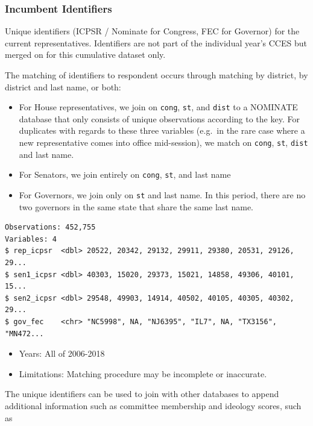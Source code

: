 \documentclass[10pt,article,oneside]{memoir}
\theoremstyle{definition}
\begin{document}
\subsubsection{Incumbent Identifiers}\label{incumbent-identifiers}

Unique identifiers (ICPSR / Nominate for Congress, FEC for Governor) for
the current representatives. Identifiers are not part of the individual
year's CCES but merged on for this cumulative dataset only.

The matching of identifiers to respondent occurs through matching by
district, by district and last name, or both:

\begin{itemize}
\tightlist
\item
  For House representatives, we join on \texttt{cong}, \texttt{st}, and
  \texttt{dist} to a NOMINATE database that only consists of unique
  observations according to the key. For duplicates with regards to
  these three variables (e.g.~in the rare case where a new
  representative comes into office mid-session), we match on
  \texttt{cong}, \texttt{st}, \texttt{dist} and last name.
\item
  For Senators, we join entirely on \texttt{cong}, \texttt{st}, and last
  name
\item
  For Governors, we join only on \texttt{st} and last name. In this
  period, there are no two governors in the same state that share the
  same last name.
\end{itemize}

\begin{verbatim}
Observations: 452,755
Variables: 4
$ rep_icpsr  <dbl> 20522, 20342, 29132, 29911, 29380, 20531, 29126, 29...
$ sen1_icpsr <dbl> 40303, 15020, 29373, 15021, 14858, 49306, 40101, 15...
$ sen2_icpsr <dbl> 29548, 49903, 14914, 40502, 40105, 40305, 40302, 29...
$ gov_fec    <chr> "NC5998", NA, "NJ6395", "IL7", NA, "TX3156", "MN472...
\end{verbatim}

\begin{itemize}
\tightlist
\item
  Years: All of 2006-2018
\item
  Limitations: Matching procedure may be incomplete or inaccurate.
\end{itemize}

The unique identifiers can be used to join with other databases to
append additional information such as committee membership and ideology
scores, such as
\end{document}
